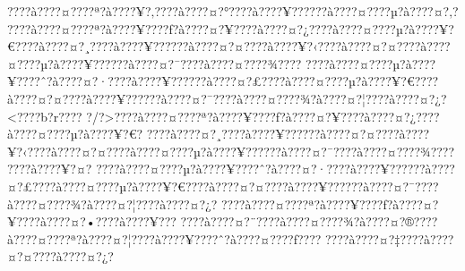 \documentclass[11pt, openany]{book}
\begin{document}
{{{{{{{{{{{{{{{{{{{{{{{{{{{{{{{{{{{{{{{{{{{{{{{{{{{{{{{{{{{{{{{{{{{{{{{{{{{{{{{{{{{{{{{{{{{{{{{{{{{{{{{{{{{{{???\textbar{}?à???\textbar{}?¤???\textbar{}?ª?à???\textbar{}?¥?‚???\textbar{}?à???\textbar{}?¤?°???\textbar{}?à???\textbar{}?¥?????\textbar{}?à???\textbar{}?¤???\textbar{}?µ?à???\textbar{}?¤?‚?
???\textbar{}?à???\textbar{}?¤???\textbar{}?ª?à???\textbar{}?¥???\textbar{}?ƒ?à???\textbar{}?¤?¥???\textbar{}?à???\textbar{}?¤?¿???\textbar{}?à???\textbar{}?¤???\textbar{}?µ?à???\textbar{}?¥?€???\textbar{}?à???\textbar{}?¤?¸???\textbar{}?à???\textbar{}?¥?????\textbar{}?à???\textbar{}?¤?¤???\textbar{}?à???\textbar{}?¥?‹???\textbar{}?à???\textbar{}?¤?¤???\textbar{}?à???\textbar{}?¤???\textbar{}?µ?à???\textbar{}?¥?????\textbar{}?à???\textbar{}?¤?¯???\textbar{}?à???\textbar{}?¤???\textbar{}?¾???\textbar{}?
???\textbar{}?à???\textbar{}?¤???\textbar{}?µ?à???\textbar{}?¥???\textbar{}?ˆ?à???\textbar{}?¤?·???\textbar{}?à???\textbar{}?¥?????\textbar{}?à???\textbar{}?¤?£???\textbar{}?à???\textbar{}?¤???\textbar{}?µ?à???\textbar{}?¥?€???\textbar{}?à???\textbar{}?¤?¤???\textbar{}?à???\textbar{}?¥?????\textbar{}?à???\textbar{}?¤?¯???\textbar{}?à???\textbar{}?¤???\textbar{}?¾?à???\textbar{}?¤?¦???\textbar{}?à???\textbar{}?¤?¿?\textless{}???\textbar{}?b?r???\textbar{}?
?/?\textgreater{}???\textbar{}?à???\textbar{}?¤???\textbar{}?ª?à???\textbar{}?¥???\textbar{}?ƒ?à???\textbar{}?¤?¥???\textbar{}?à???\textbar{}?¤?¿???\textbar{}?à???\textbar{}?¤???\textbar{}?µ?à???\textbar{}?¥?€?
???\textbar{}?à???\textbar{}?¤?¸???\textbar{}?à???\textbar{}?¥?????\textbar{}?à???\textbar{}?¤?¤???\textbar{}?à???\textbar{}?¥?‹???\textbar{}?à???\textbar{}?¤?¤???\textbar{}?à???\textbar{}?¤???\textbar{}?µ?à???\textbar{}?¥?????\textbar{}?à???\textbar{}?¤?¯???\textbar{}?à???\textbar{}?¤???\textbar{}?¾???\textbar{}?
???\textbar{}?à???\textbar{}?¥?¤?
???\textbar{}?à???\textbar{}?¤???\textbar{}?µ?à???\textbar{}?¥???\textbar{}?ˆ?à???\textbar{}?¤?·???\textbar{}?à???\textbar{}?¥?????\textbar{}?à???\textbar{}?¤?£???\textbar{}?à???\textbar{}?¤???\textbar{}?µ?à???\textbar{}?¥?€???\textbar{}?à???\textbar{}?¤?¤???\textbar{}?à???\textbar{}?¥?????\textbar{}?à???\textbar{}?¤?¯???\textbar{}?à???\textbar{}?¤???\textbar{}?¾?à???\textbar{}?¤?¦???\textbar{}?à???\textbar{}?¤?¿?
???\textbar{}?à???\textbar{}?¤???\textbar{}?ª?à???\textbar{}?¥???\textbar{}?ƒ?à???\textbar{}?¤?¥???\textbar{}?à???\textbar{}?¤?•???\textbar{}?à???\textbar{}?¥???
???\textbar{}?à???\textbar{}?¤?¨???\textbar{}?à???\textbar{}?¤???\textbar{}?¾?à???\textbar{}?¤?®???\textbar{}?à???\textbar{}?¤???\textbar{}?ª?à???\textbar{}?¤?¦???\textbar{}?à???\textbar{}?¥???\textbar{}?ˆ?à???\textbar{}?¤???\textbar{}?ƒ???\textbar{}?
???\textbar{}?à???\textbar{}?¤?‡???\textbar{}?à???\textbar{}?¤?¤???\textbar{}?à???\textbar{}?¤?¿?
}}}}}}}}}}}}}}}}}}}}}}}}}}}}}}}}}}}}}}}}}}}}}}}}}}}}}}}}}}}}}}}}}}}}}}}}}}}}}}}}}}}}}}}}}}}}}}}}}}}}}}}}}}}}}
\end{document}
